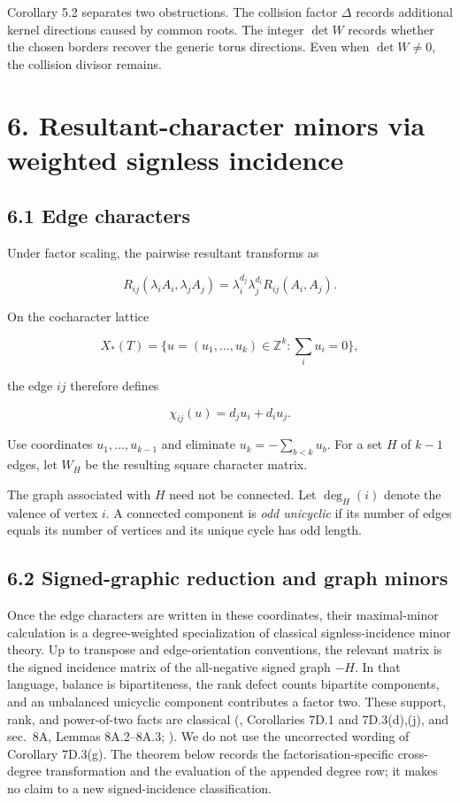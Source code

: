 \documentclass[
  11pt,
  a4paper,
]{article}
\begin{document}
Corollary 5.2 separates two obstructions. The collision factor
\(\Delta\) records additional kernel directions caused by common roots.
The integer \(\det W\) records whether the chosen borders recover the
generic torus directions. Even when \(\det W\ne0\), the collision
divisor remains.

\section{6. Resultant-character minors via weighted signless
incidence}\label{resultant-character-minors-via-weighted-signless-incidence}

\subsection{6.1 Edge characters}\label{edge-characters}

Under factor scaling, the pairwise resultant transforms as

\[
 R_{ij}(\lambda_iA_i,\lambda_jA_j)
 =\lambda_i^{d_j}\lambda_j^{d_i}R_{ij}(A_i,A_j).
\]

On the cocharacter lattice

\[
 X_*(T)=\{u=(u_1,\ldots,u_k)\in\mathbb Z^k:\sum_i u_i=0\},
\]

the edge \(ij\) therefore defines

\[
 \chi_{ij}(u)=d_ju_i+d_iu_j.
\]

Use coordinates \(u_1,\ldots,u_{k-1}\) and eliminate
\(u_k=-\sum_{b<k}u_b\). For a set \(H\) of \(k-1\) edges, let \(W_H\) be
the resulting square character matrix.

The graph associated with \(H\) need not be connected. Let \(\deg_H(i)\)
denote the valence of vertex \(i\). A connected component is \emph{odd
unicyclic} if its number of edges equals its number of vertices and its
unique cycle has odd length.

\subsection{6.2 Signed-graphic reduction and graph
minors}\label{signed-graphic-reduction-and-graph-minors}

Once the edge characters are written in these coordinates, their
maximal-minor calculation is a degree-weighted specialization of
classical signless-incidence minor theory. Up to transpose and
edge-orientation conventions, the relevant matrix is the signed
incidence matrix of the all-negative signed graph \(-H\). In that
language, balance is bipartiteness, the rank defect counts bipartite
components, and an unbalanced unicyclic component contributes a factor
two. These support, rank, and power-of-two facts are classical
(, Corollaries 7D.1
and 7D.3(d),(j), and sec.~8A, Lemmas 8A.2--8A.3;
). We do not use the
uncorrected wording of Corollary 7D.3(g). The theorem below records the
factorisation-specific cross-degree transformation and the evaluation of
the appended degree row; it makes no claim to a new signed-incidence
classification.
\end{document}
